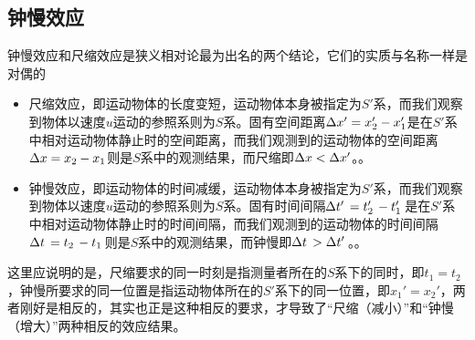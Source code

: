 \subsection{钟慢效应}
钟慢效应和尺缩效应是狭义相对论最为出名的两个结论，它们的实质与名称一样是对偶的
\begin{itemize}
    \item 尺缩效应，即运动物体的长度变短，运动物体本身被指定为$S'$系，而我们观察到物体以速度$u$运动的参照系则为$S$系。固有空间距离$\Delta{x}'=x_2'-x_1'$是在$S'$系中相对运动物体静止时的空间距离，而我们观测到的运动物体的空间距离$\Delta{x}=x_2-x_1$则是$S$系中的观测结果，而尺缩即$\Delta{x}<\Delta{x}'$。。
    \item 钟慢效应，即运动物体的时间减缓，运动物体本身被指定为$S'$系，而我们观察到物体以速度$u$运动的参照系则为$S$系。固有时间间隔$\Delta{t}'\hspace{0.15em}=t_2'\hspace{0.15em}-t_1'\hspace{0.15em}$是在$S'$系中相对运动物体静止时的时间间隔，而我们观测到的运动物体的时间间隔$\Delta{t}\hspace{0.15em}=t_2\hspace{0.15em}-t_1\hspace{0.15em}$则是$S$系中的观测结果，而钟慢即$\Delta{t}\hspace{0.15em}>\Delta{t}'\hspace{0.15em}$。。
\end{itemize}

这里应说明的是，尺缩要求的同一时刻是指测量者所在的$S$系下的同时，即$t_1=t_2$，钟慢所要求的同一位置是指运动物体所在的$S'$系下的同一位置，即$x_1'=x_2'$，两者刚好是相反的，其实也正是这种相反的要求，才导致了“尺缩（减小）”和“钟慢（增大）”两种相反的效应结果。


